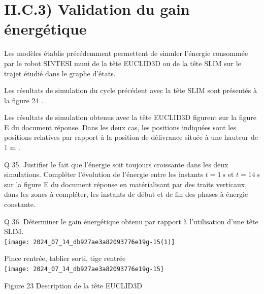 \documentclass[10pt]{article}
\begin{document}
\section*{II.C.3) Validation du gain énergétique}
Les modèles établis précédemment permettent de simuler l'énergie consommée par le robot SINTESI muni de la tête EUCLID3D ou de la tête SLIM sur le trajet étudié dans le graphe d'états.

Les résultats de simulation du cycle précédent avec la tête SLIM sont présentés à la figure 24 .

Les résultats de simulation obtenus avec la tête EUCLID3D figurent sur la figure E du document réponse. Dans les deux cas, les positions indiquées sont les positions relatives par rapport à la position de délivrance située à une hauteur de 1 m .

Q 35. Justifier le fait que l'énergie soit toujours croissante dans les deux simulations. Compléter l'évolution de l'énergie entre les instants $t=1 \mathrm{~s}$ et $t=14 \mathrm{~s}$ sur la figure E du document réponse en matérialisant par des traits verticaux, dans les zones à compléter, les instants de début et de fin des phases à énergie constante.

Q 36. Déterminer le gain énergétique obtenu par rapport à l'utilisation d'une tête SLIM.\\
\texttt{[image: 2024\_07\_14\_db927ae3a82093776e19g-15(1)]}

Pince rentrée, tablier sorti, tige rentrée\\
\texttt{[image: 2024\_07\_14\_db927ae3a82093776e19g-15]}

Figure 23 Description de la tête EUCLID3D
\end{document}
